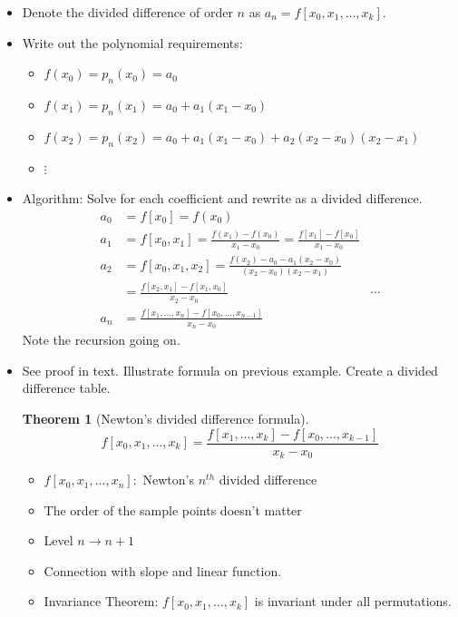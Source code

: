 \documentclass{article}
\newtheorem{thm}{Theorem}[section]
\theoremstyle{remark}
\begin{document}
\begin{enumerate}
\begin{enumerate}
\begin{itemize}
\item Denote the divided difference of order $n$ as $a_n = f[x_0,x_1,\dots,x_k]$. 
\item Write out the polynomial requirements:
\begin{itemize}
\item $f(x_0) = p_n(x_0) = a_0$
\item $f(x_1) = p_n(x_1) = a_0 + a_1(x_1-x_0)$
\item $f(x_2) = p_n(x_2) = a_0 + a_1(x_1-x_0) + a_2(x_2-x_0)(x_2-x_1)$
\item $\vdots$
\end{itemize}
\item Algorithm: Solve for each coefficient and rewrite as a divided difference.
\begin{align*}
a_0 &= f[x_0] = f(x_0) \\
a_1 &= f[x_0,x_1] = \frac{f(x_1)-f(x_0)}{x_1-x_0}= \frac{f[x_1]-f[x_0]}{x_1-x_0}\\
a_2 &= f[x_0,x_1,x_2] = \frac{f(x_2)-a_0-a_1(x_2-x_0)}{(x_2-x_0)(x_2-x_1)}\\
&= \frac{f[x_2,x_1]-f[x_1,x_0]}{x_2-x_0}
& \cdots \\
a_n &= \frac{f[x_1,\dots,x_n]-f[x_0,\dots,x_{n-1}]}{x_n-x_0}
\end{align*}
Note the recursion going on.
\item See proof in text. Illustrate formula on previous example. Create a divided difference table.
\begin{thm}[Newton's divided difference formula]
$$f[x_0,x_1,...,x_k] = \frac{f[x_1,...,x_k]-f[x_0,...,x_{k-1}]}{x_k-x_0}$$
\end{thm}
\begin{itemize}
\item $f[x_0,x_1, ..., x_n]:$ Newton's $n^{th}$ divided difference
\item The order of the sample points doesn't matter
\item Level $n\rightarrow n+1$
\item Connection with slope and linear function.
\item Invariance Theorem: $f[x_0,x_1,\dots ,x_k]$ is invariant under all permutations.
\end{itemize}
\end{itemize}


\end{enumerate}
\end{enumerate}
\end{document}
